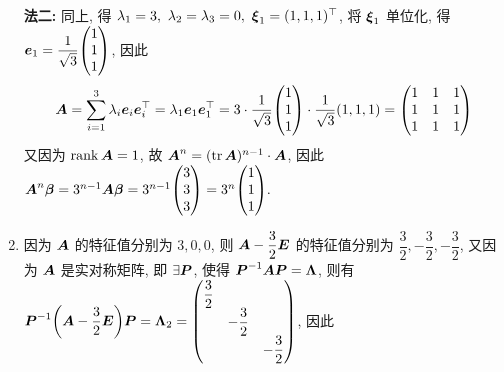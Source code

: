 \begin{solution}
\begin{enumerate}[label=(\arabic{*})]
              \textbf{法二: }同上, 得 $\lambda_1=3,~\lambda_2=\lambda_3=0,~\vb*{\xi}_1=(1,1,1)^\top$, 将 $\vb*{\xi}_1$ 单位化, 得 $\vb*{e}_1=\dfrac{1}{\sqrt{3}}\mqty(1\\1\\1)$, 因此
              $$\vb*{A}=\sum_{i=1}^{3}\lambda_i\vb*{e}_i\vb*{e}_i^\top=\lambda_1\vb*{e}_1\vb*{e}_1^\top=3\cdot\dfrac{1}{\sqrt{3}}\mqty(1\\1\\1)\cdot\dfrac{1}{\sqrt{3}}(1,1,1)=\mqty(1&1&1\\1&1&1\\1&1&1)$$
              又因为 $\rank\vb*{A}=1$, 故 $\vb*{A}^n=(\tr\vb*{A})^{n-1}\cdot\vb*{A}$, 因此 $\vb*{A}^n\vb*{\beta}=3^{n-1}\vb*{A\beta}=3^{n-1}\mqty(3\\3\\3)=3^{n}\mqty(1\\1\\1).$
        \item 因为 $\vb*{A}$ 的特征值分别为 $3,0,0$, 则 $\vb*{A}-\dfrac{3}{2}\vb*{E}$ 的特征值分别为 $\dfrac{3}{2},-\dfrac{3}{2},-\dfrac{3}{2}$, 又因为 $\vb*{A}$ 是实对称矩阵, 即 $\exists\vb*{P}$, 使得 $\vb*{P}^{-1}\vb*{AP}=\vb*{\Lambda}$, 则有
              $\vb*{P}^{-1}\qty(\vb*{A}-\dfrac{3}{2}\vb*{E})\vb*{P}=\vb*{\Lambda}_2=\mqty(\dfrac{3}{2}\\&-\dfrac{3}{2}\\&&-\dfrac{3}{2})$, 因此
    \end{enumerate}
\end{solution}

